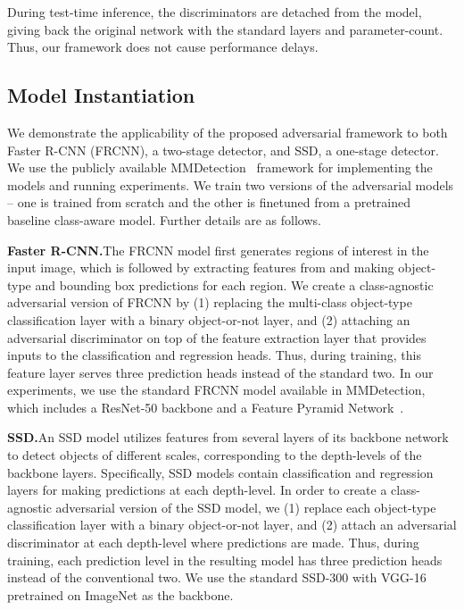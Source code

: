 \documentclass[10pt,twocolumn,letterpaper]{article}
\begin{document}
During test-time inference, the discriminators are detached from the model, giving back the original network with the standard layers and parameter-count. Thus, our framework does not cause performance delays.


\subsection{Model Instantiation}

We demonstrate the applicability of the proposed adversarial framework to both Faster R-CNN (FRCNN), a two-stage detector, and SSD, a one-stage detector. We use the publicly available MMDetection~\cite{bib:mmdetection} framework for implementing the models and running experiments. We train two versions of the adversarial models -- one is trained from scratch and the other is finetuned from a pretrained baseline class-aware model. Further details are as follows.

\vspace{3pt}
\noindent\textbf{Faster R-CNN.}\quad The FRCNN model first generates regions of interest in the input image, which is followed by extracting features from and making object-type and bounding box predictions for each region. We create a class-agnostic adversarial version of FRCNN by (1) replacing the multi-class object-type classification layer with a binary object-or-not layer, and (2) attaching an adversarial discriminator on top of the feature extraction layer that provides inputs to the classification and regression heads. Thus, during training, this feature layer serves three prediction heads instead of the standard two. In our experiments, we use the standard FRCNN model available in MMDetection, which includes a ResNet-50 backbone and a Feature Pyramid Network~\cite{bib:fpn}.

\vspace{3pt}
\noindent\textbf{SSD.}\quad An SSD model utilizes features from several layers of its backbone network to detect objects of different scales, corresponding to the depth-levels of the backbone layers. Specifically, SSD models contain classification and regression layers for making predictions at each depth-level. In order to create a class-agnostic adversarial version of the SSD model, we (1) replace each object-type classification layer with a binary object-or-not layer, and (2) attach an adversarial discriminator at each depth-level where predictions are made. Thus, during training, each prediction level in the resulting model has three prediction heads instead of the conventional two. We use the standard SSD-300 with VGG-16 pretrained on ImageNet as the backbone.
\end{document}
